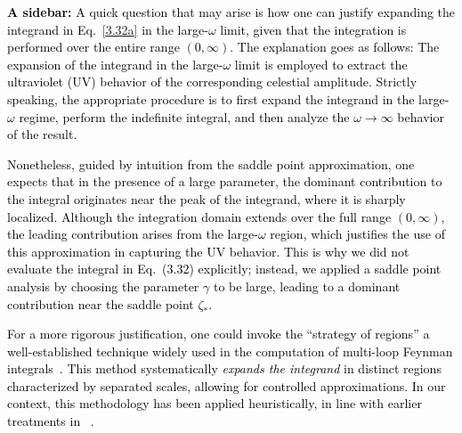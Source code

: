 \textcolor{black}{
\textbf{A sidebar:} A quick question that may arise is how one can justify expanding the integrand in Eq.~\eqref{3.32a} in the large-\(\omega\) limit, given that the integration is performed over the entire range \((0, \infty)\).
 The explanation goes as follows: The expansion of the integrand in the large-\(\omega\) limit is employed to extract the ultraviolet (UV) behavior of the corresponding celestial amplitude. Strictly speaking, the appropriate procedure is to first expand the integrand in the large-\(\omega\) regime, perform the indefinite integral, and then analyze the \(\omega \to \infty\) behavior of the result.
}

\textcolor{black}{
Nonetheless, guided by intuition from the saddle point approximation, one expects that in the presence of a large parameter, the dominant contribution to the integral originates near the peak of the integrand, where it is sharply localized. Although the integration domain extends over the full range \((0, \infty)\), the leading contribution arises from the large-\(\omega\) region, which justifies the use of this approximation in capturing the UV behavior. This is why we did not evaluate the integral in Eq.~(3.32) explicitly; instead, we applied a saddle point analysis by choosing the parameter \(\gamma\) to be large, leading to a dominant contribution near the saddle point \(\zeta_*\).}

\textcolor{black}{
For a more rigorous justification, one could invoke the ``strategy of regions'' a well-established technique widely used in the computation of multi-loop Feynman integrals~\cite{Beneke:1997zp}. This method systematically \textit{expands the integrand} in distinct regions characterized by separated scales, allowing for controlled approximations. In our context, this methodology has been applied heuristically, in line with earlier treatments in ~\cite{Adamo:2024mqn}. }

